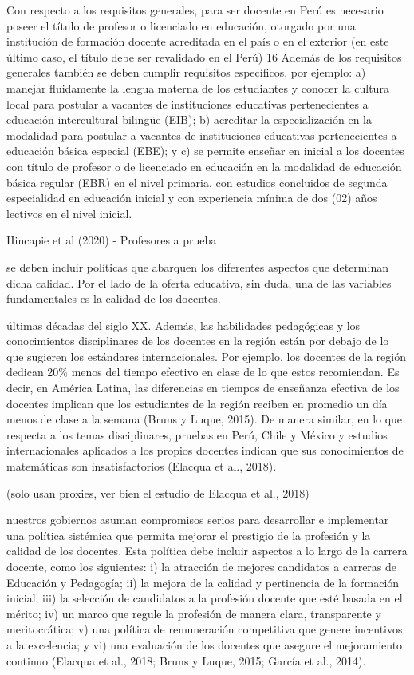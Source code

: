 Con respecto a los requisitos generales, para ser docente en Perú es necesario poseer el título de profesor o licenciado en educación, otorgado por una institución de formación docente acreditada en el país o en el exterior (en este último caso, el título debe ser revalidado en el Perú) 16 Además de los requisitos generales también se deben cumplir requisitos específicos, por ejemplo: a) manejar fluidamente la lengua materna de los estudiantes y conocer la cultura local para postular a vacantes de instituciones educativas pertenecientes a educación intercultural bilingüe (EIB); b) acreditar la especialización en la modalidad para postular a vacantes de instituciones educativas pertenecientes a educación básica especial (EBE); y c) se permite enseñar en inicial a los docentes con título de profesor o de licenciado en educación en la modalidad de educación básica regular (EBR) en el nivel primaria, con estudios concluidos de segunda especialidad en educación inicial y con experiencia mínima de dos (02) años lectivos en el nivel inicial.




Hincapie et al (2020) - Profesores a prueba

se deben incluir políticas que abarquen los diferentes aspectos que determinan dicha calidad. Por el lado de la oferta educativa, sin duda, una de las variables fundamentales es la calidad de los docentes.


últimas décadas del siglo XX. Además, las habilidades pedagógicas y los conocimientos disciplinares de los docentes en la región están por debajo de lo que sugieren los estándares internacionales. Por ejemplo, los docentes de la región dedican 20\% menos del tiempo efectivo en clase de lo que estos recomiendan. Es decir, en América Latina, las diferencias
en tiempos de enseñanza efectiva de los docentes implican que los estudiantes de la región reciben en promedio un día menos de clase a la semana (Bruns y Luque, 2015). De manera similar, en lo que respecta a los temas disciplinares, pruebas en Perú, Chile y México y estudios internacionales aplicados a los propios docentes indican que sus conocimientos de
matemáticas son insatisfactorios (Elacqua et al., 2018).

(solo usan proxies, ver bien el estudio de Elacqua et al., 2018)


nuestros gobiernos asuman compromisos serios para desarrollar e implementar una política sistémica que permita mejorar el prestigio de la profesión y la calidad de los docentes. Esta política debe incluir aspectos a lo largo de la carrera docente, como los siguientes: i) la atracción de mejores candidatos a carreras de Educación y Pedagogía; ii) la mejora de la calidad y pertinencia de la formación inicial; iii) la selección de candidatos a la profesión docente que esté basada en el mérito; iv) un marco que regule la profesión de manera clara, transparente y meritocrática; v) una política de remuneración competitiva que genere incentivos a la excelencia; y vi) una evaluación de los docentes que asegure el mejoramiento continuo (Elacqua et al., 2018; Bruns y Luque, 2015; García et al., 2014).

